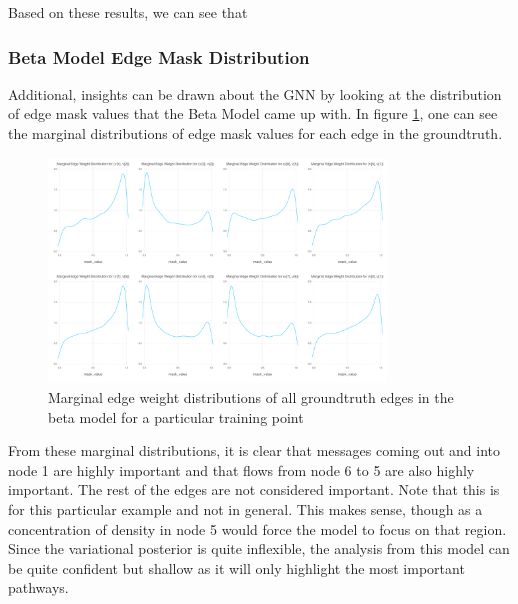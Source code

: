 Based on these results, we can see that 

\subsubsection{Beta Model Edge Mask Distribution}
Additional, insights can be drawn about the GNN by looking at the distribution of edge mask values that the Beta Model came up with. In figure \ref{fig:tree-model-beta-marginal}, one can see the marginal distributions of edge mask values for each edge in the groundtruth. 
\begin{figure}[htb]
	\centering
	\includegraphics[width=0.8\textwidth]{images/tree-model-beta-marginal.pdf}
	\caption{Marginal edge weight distributions of all groundtruth edges in the beta model for a particular training point}
	\label{fig:tree-model-beta-marginal}
\end{figure}
From these marginal distributions, it is clear that messages coming out and into node 1 are highly important and that flows from node 6 to 5 are also highly important. The rest of the edges are not considered important. Note that this is for this particular example and not in general. This makes sense, though as a concentration of density in node 5 would force the model to focus on that region. Since the variational posterior is quite inflexible, the analysis from this model can be quite confident but shallow as it will only highlight the most important pathways.

